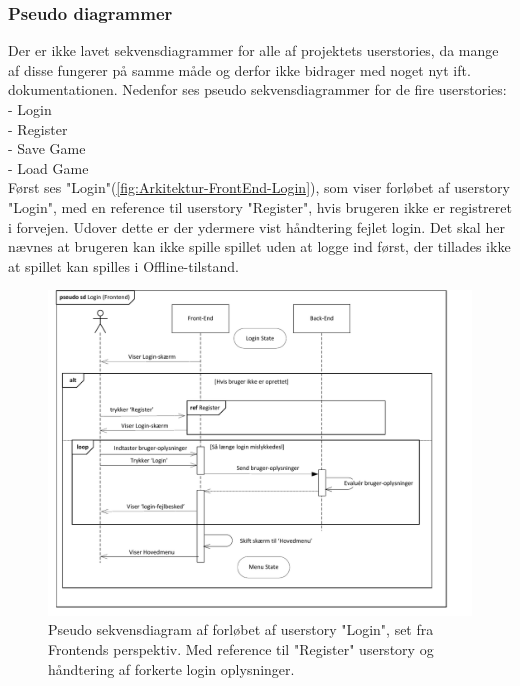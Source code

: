 \subsubsection{Pseudo diagrammer}
Der er ikke lavet sekvensdiagrammer for alle af projektets userstories, da mange af disse fungerer på samme måde og derfor ikke bidrager med noget nyt ift. dokumentationen.
Nedenfor ses pseudo sekvensdiagrammer for de fire userstories:\\
- Login\\
- Register\\
- Save Game\\
- Load Game\\

\noindent Først ses "Login"(\autoref{fig:Arkitektur-FrontEnd-Login}), som viser forløbet af userstory "Login", med en reference til userstory "Register", hvis brugeren ikke er registreret i forvejen. Udover dette er der ydermere vist håndtering fejlet login. Det skal her nævnes at brugeren kan ikke spille spillet uden at logge ind først, der tillades ikke at spillet kan spilles i Offline-tilstand.\\

\begin{figure}[H]
\centering
\includegraphics[width = \textwidth]{02-Body/Images/Front-End_-_Arkitektur-login.pdf}
\caption{Pseudo sekvensdiagram af forløbet af userstory "Login", set fra Frontends perspektiv. Med reference til "Register" userstory og håndtering af forkerte login oplysninger.}
\label{fig:Arkitektur-FrontEnd-Login}
\end{figure}

